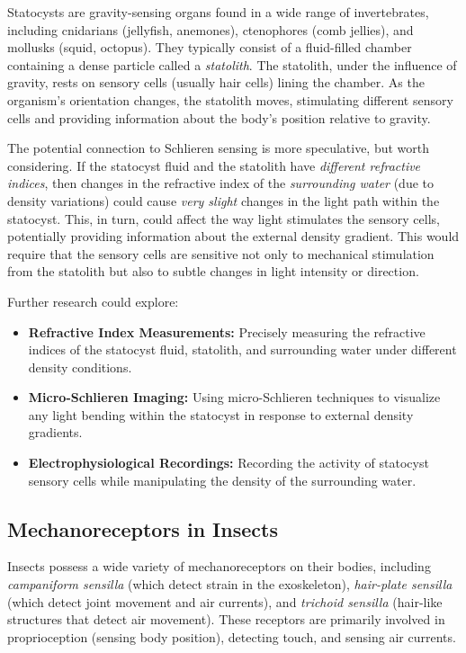\documentclass[11pt]{article}
\begin{document}
Statocysts are gravity-sensing organs found in a wide range of invertebrates, including cnidarians (jellyfish, anemones), ctenophores (comb jellies), and mollusks (squid, octopus). They typically consist of a fluid-filled chamber containing a dense particle called a \textit{statolith}. The statolith, under the influence of gravity, rests on sensory cells (usually hair cells) lining the chamber. As the organism's orientation changes, the statolith moves, stimulating different sensory cells and providing information about the body's position relative to gravity.

The potential connection to Schlieren sensing is more speculative, but worth considering. If the statocyst fluid and the statolith have \textit{different refractive indices}, then changes in the refractive index of the \textit{surrounding water} (due to density variations) could cause \textit{very slight} changes in the light path within the statocyst. This, in turn, could affect the way light stimulates the sensory cells, potentially providing information about the external density gradient. This would require that the sensory cells are sensitive not only to mechanical stimulation from the statolith but also to subtle changes in light intensity or direction.

Further research could explore:
\begin{itemize}
    \item \textbf{Refractive Index Measurements:} Precisely measuring the refractive indices of the statocyst fluid, statolith, and surrounding water under different density conditions.
    \item \textbf{Micro-Schlieren Imaging:} Using micro-Schlieren techniques to visualize any light bending within the statocyst in response to external density gradients.
    \item \textbf{Electrophysiological Recordings:} Recording the activity of statocyst sensory cells while manipulating the density of the surrounding water.
\end{itemize}

\subsection{Mechanoreceptors in Insects}

Insects possess a wide variety of mechanoreceptors on their bodies, including \textit{campaniform sensilla} (which detect strain in the exoskeleton), \textit{hair-plate sensilla} (which detect joint movement and air currents), and \textit{trichoid sensilla} (hair-like structures that detect air movement). These receptors are primarily involved in proprioception (sensing body position), detecting touch, and sensing air currents.
\end{document}
